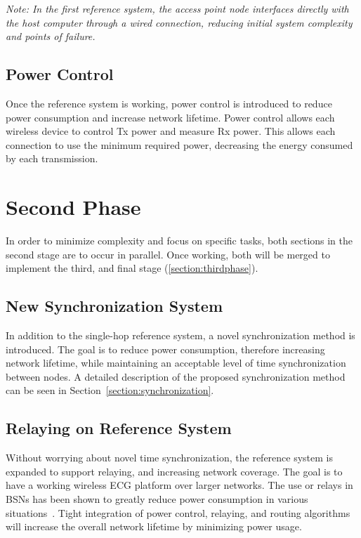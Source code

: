 \documentclass{article}
\begin{document}
\emph{Note: In the first reference system, the access point node interfaces directly with the host computer through a wired connection, reducing initial system complexity and points of failure.}

\subsection{Power Control}
Once the reference system is working, power control is introduced to reduce power consumption and increase network lifetime. Power control allows each wireless device to control Tx power and measure Rx power. This allows each connection to use the minimum required power, decreasing the energy consumed by each transmission.

\section{Second Phase}\label{section:secondphase}
In order to minimize complexity and focus on specific tasks, both sections in the second stage are to occur in parallel. Once working, both will be merged to implement the third, and final stage (\ref{section:thirdphase}).

\subsection{New Synchronization System}\label{subsection:synchronization}
In addition to the single-hop reference system, a novel synchronization method is introduced. The goal is to reduce power consumption, therefore increasing network lifetime, while maintaining an acceptable level of time synchronization between nodes. A detailed description of the proposed synchronization method can be seen in Section~\ref{section:synchronization}.

\subsection{Relaying on Reference System}\label{subsection:relays}
Without worrying about novel time synchronization, the reference system is expanded to support relaying, and increasing network coverage. The goal is to have a working wireless ECG platform over larger networks.  The use or relays in BSNs has been shown to greatly reduce power consumption in various situations~\cite{relay:creepingwave}. Tight integration of power control, relaying, and routing algorithms will increase the overall network lifetime by minimizing power usage. 
\end{document}
